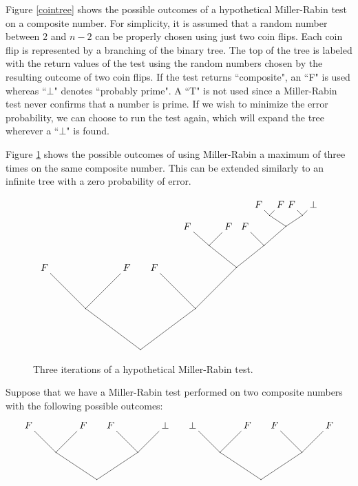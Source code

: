 Figure \ref{cointree} shows the possible outcomes of a hypothetical Miller-Rabin test on a composite number.  For simplicity, it is assumed that a random number between $2$ and $n-2$ can be properly chosen using just two coin flips.  Each coin flip is represented by a branching of the binary tree.  The top of the tree is labeled with the return values of the test using the random numbers chosen by the resulting outcome of two coin flips.  If the test returns ``composite", an ``F" is used whereas ``$\bot$" denotes ``probably prime".  A ``T" is not used since a Miller-Rabin test never confirms that a number is prime.  If we wish to minimize the error probability, we can choose to run the test again, which will expand the tree wherever a ``$\bot$" is found.

Figure \ref{cointree2} shows the possible outcomes of using Miller-Rabin a maximum of three times on the same composite number.  This can be extended similarly to an infinite tree with a zero probability of error.
\begin{figure}
\[
\begin{xy}
(0,30)*+{F} = "v4";%
(30,30)*+{F} = "v5";%
(40,30)*+{F} = "v6";%
(70,30)*{} = "v7";%
(15,15)*{} = "v8";%
(55,15)*{} = "v9";%
(35,0)*{} = "v10";%
{\ar@{-} "v9"; "v6"};%
{\ar@{-} "v9"; "v7"};%
{\ar@{-} "v8"; "v5"};%
{\ar@{-} "v8"; "v4"};%
{\ar@{-} "v10"; "v8"};%
{\ar@{-} "v10"; "v9"};%
(52,45)*+{F} = "v14";%
(67,45)*+{F} = "v15";%
(73,45)*+{F} = "v16";%
(88,45)*{} = "v17";%
(60,38)*{} = "v18";%
(80,38)*{} = "v19";%
{\ar@{-} "v19"; "v16"};%
{\ar@{-} "v19"; "v17"};%
{\ar@{-} "v18"; "v15"};%
{\ar@{-} "v18"; "v14"};%
{\ar@{-} "v7"; "v18"};%
{\ar@{-} "v7"; "v19"};
(78,53)*+{F} = "v24";%
(86,53)*+{F} = "v25";%
(90,53)*+{F} = "v26";%
(98,53)*+{\bot} = "v27";%
(82,49)*{} = "v28";%
(94,49)*{} = "v29";%
{\ar@{-} "v29"; "v26"};%
{\ar@{-} "v29"; "v27"};%
{\ar@{-} "v28"; "v25"};%
{\ar@{-} "v28"; "v24"};%
{\ar@{-} "v17"; "v28"};%
{\ar@{-} "v17"; "v29"};
\end{xy}
\]
\caption{Three iterations of a hypothetical Miller-Rabin test.}
\label{cointree2}
\end{figure}

Suppose that we have a Miller-Rabin test performed on two composite numbers with the following possible outcomes:
\[
\begin{xy}
(0,20)*+{F} = "v4";%
(20,20)*+{F} = "v5";%
(30,20)*+{F} = "v6";%
(50,20)*+{\bot} = "v7";%
(10,10)*{} = "v8";%
(40,10)*{} = "v9";%
(25,0)*{} = "v10";%
(60,20)*+{\bot} = "v14";%
(80,20)*+{F} = "v15";%
(90,20)*+{F} = "v16";%
(110,20)*+{F} = "v17";%
(70,10)*{} = "v18";%
(100,10)*{} = "v19";%
(85,0)*{} = "v20";%
{\ar@{-} "v9"; "v6"};%
{\ar@{-} "v9"; "v7"};%
{\ar@{-} "v8"; "v5"};%
{\ar@{-} "v8"; "v4"};%
{\ar@{-} "v10"; "v8"};%
{\ar@{-} "v10"; "v9"};
{\ar@{-} "v19"; "v16"};%
{\ar@{-} "v19"; "v17"};%
{\ar@{-} "v18"; "v15"};%
{\ar@{-} "v18"; "v14"};%
{\ar@{-} "v20"; "v18"};%
{\ar@{-} "v20"; "v19"};
\end{xy}
\]

